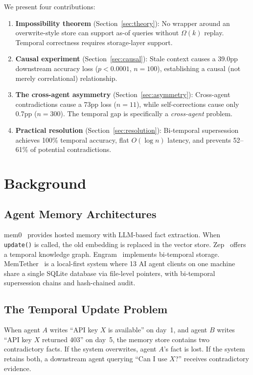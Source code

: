 \documentclass{article}
\begin{document}
We present four contributions:

\begin{enumerate}
\item \textbf{Impossibility theorem} (Section~\ref{sec:theory}): No wrapper around an overwrite-style store can support as-of queries without $\Omega(k)$ replay. Temporal correctness requires storage-layer support.
\item \textbf{Causal experiment} (Section~\ref{sec:causal}): Stale context causes a 39.0pp downstream accuracy loss ($p < 0.0001$, $n{=}100$), establishing a causal (not merely correlational) relationship.
\item \textbf{The cross-agent asymmetry} (Section~\ref{sec:asymmetry}): Cross-agent contradictions cause a 73pp loss ($n{=}11$), while self-corrections cause only 0.7pp ($n{=}300$). The temporal gap is specifically a \emph{cross-agent} problem.
\item \textbf{Practical resolution} (Section~\ref{sec:resolution}): Bi-temporal supersession achieves 100\% temporal accuracy, flat $O(\log n)$ latency, and prevents 52--61\% of potential contradictions.
\end{enumerate}

\section{Background}
\label{sec:background}

\subsection{Agent Memory Architectures}
mem0~\cite{mem0} provides hosted memory with LLM-based fact extraction. When \texttt{update()} is called, the old embedding is replaced in the vector store. Zep~\cite{zep} offers a temporal knowledge graph. Engram~\cite{engram} implements bi-temporal storage. MemTether~\cite{memtether} is a local-first system where 13 AI agent clients on one machine share a single SQLite database via file-level pointers, with bi-temporal supersession chains and hash-chained audit.

\subsection{The Temporal Update Problem}
When agent $A$ writes ``API key $X$ is available'' on day~1, and agent $B$ writes ``API key $X$ returned 403'' on day~5, the memory store contains two contradictory facts. If the system overwrites, agent $A$'s fact is lost. If the system retains both, a downstream agent querying ``Can I use $X$?'' receives contradictory evidence.
\end{document}
